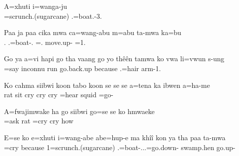 \z
\ea%

\gll A=xhuti i=wanga-ju\\ =scrunch.(sugarcane) .=boat.-3.\\ \glt {}

\z
\ea%

\gll Paa ja paa cika mwa ca=wang-abu m=abu ta-mwa ka=bu\\    .  .=boat-. =. move.up- =1.\\ \glt {}
\z

\ea%
\gll  Go ya a=vi hapi go tha vaang go yo thêên tamwa ko vwa li=vwun s-ung\\    =say    inconnu   run go.back.up because  .=hair arm-1.\\ \glt {}
\z

\ea%
\gll Ko cahma siibwi koon tabo koon se se se a=tena ka ibwen a=ha-me\\   rat  sit  cry cry cry =hear  squid =go-\\ \glt {}

\z
\ea%

\gll A=fwajimwake ha go siibwi go=se se ko hmwaeke\\ =ask   rat =cry cry  how\\ \glt {}
\z

\ea%
\gll E=se ko e=xhuti i=wang-abe abe=hup-e ma khîî kon ya tha paa ta-mwa\\ =cry because 1=scrunch.(sugarcane) .=boat-...=go.down-  swamp.hen     go.up-\\ \glt {}

